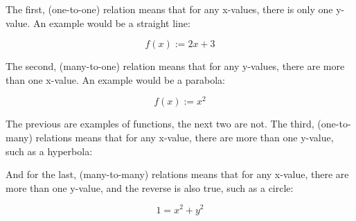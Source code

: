\documentclass{book}
\begin{document}
The first, (one-to-one) relation means that for any x-values, there is only one y-value.  An example would be a straight line:
\begin{center}
	\[f(x) := 2x + 3\]
	\begin{center}
	\end{center}
\end{center}
The second, (many-to-one) relation means that for any y-values, there are more than one x-value.  An example would be a parabola:
\begin{center}
	\[f(x) := x^2\]
	\begin{center}
	\end{center}
\end{center}
The previous are examples of functions, the next two are not.  The third, (one-to-many) relations means that for any x-value, there are more than one y-value, such as a hyperbola:
\begin{center}
\end{center}
And for the last, (many-to-many) relations means that for any x-value, there are more than one y-value, and the reverse is also true, such as a circle:
\begin{center}
	\[1 = x^2 + y^2\]
	\begin{center}
	\end{center}
\end{center}
\end{document}
